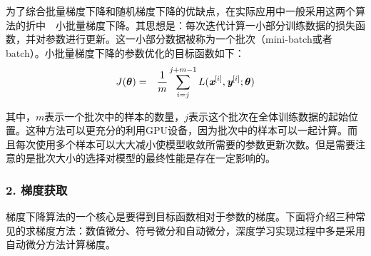 %

\vspace{0.5em}
\vspace{0.5em}

\parinterval 为了综合批量梯度下降和随机梯度下降的优缺点，在实际应用中一般采用这两个算法的折中\ \dash \ 小批量梯度下降。其思想是：每次迭代计算一小部分训练数据的损失函数，并对参数进行更新。这一小部分数据被称为一个批次（mini-batch或者batch）。小批量梯度下降的参数优化的目标函数如下：
\begin{eqnarray}
J({\bm \theta})&=&\frac{1}{m}\sum_{i=j}^{j+m-1}{L({\textbf{\em x}}^{[i]},{\textbf{\em y}}^{[i]};{\bm \theta})}
\label{eq:9-32}
\end{eqnarray}

\noindent 其中，$ m $表示一个批次中的样本的数量，$ j $表示这个批次在全体训练数据的起始位置。这种方法可以更充分的利用GPU设备，因为批次中的样本可以一起计算。而且每次使用多个样本可以大大减小使模型收敛所需要的参数更新次数。但是需要注意的是批次大小的选择对模型的最终性能是存在一定影响的。


\subsubsection{2. 梯度获取}

\parinterval 梯度下降算法的一个核心是要得到目标函数相对于参数的梯度。下面将介绍三种常见的求梯度方法：数值微分、符号微分和自动微分，深度学习实现过程中多是采用自动微分方法计算梯度。

%

\vspace{0.5em}
\vspace{0.5em}

